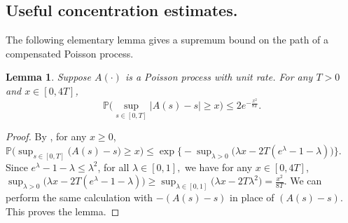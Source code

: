 \documentclass[11pt, reqno]{article}
\newtheorem{lemma}[theorem]{Lemma}
\numberwithin{equation}{section}
\numberwithin{theorem}{section}
\begin{document}
\begin{appendix}


\section{Useful concentration estimates.}\label{app:conc}

The following elementary lemma gives a supremum bound on the path of a compensated Poisson process.
\begin{lemma}\label{lem:sup-poi}
Suppose $A(\cdot)$ is a Poisson process with unit rate. For any $T>0$ and $ x\in [0, 4T]$,
$$\mathbb{P}\big(\sup_{s\in[0,T]}\left|A(s)-s\right|\geq x\big)\leq 2 e^{-\frac{x^2}{8T}}.$$
\end{lemma}
\begin{proof}
By \cite[Theorem 5, Chapter 4, Page 351]{LS}, for any $x \ge 0$,
$\mathbb{P}\big(\sup_{s\in[0,T]}\big(A(s)-s\big)\geq x\big)\leq \exp\big\{-\sup_{\lambda>0}\big(\lambda x-2T(e^{\lambda}-1-\lambda)\big)\big\}.$
Since $e^{\lambda}-1-\lambda\leq \lambda^2$, for all $\lambda\in [0,1],$
we have for any $x \in [0,4T]$, $\sup_{\lambda>0}\big(\lambda x- 2T(e^{\lambda}-1-\lambda)\big)\geq \sup_{\lambda\in[0,1]}\big(\lambda x-2T\lambda^2\big)=\frac{x^2}{8T}.$
We can perform the same calculation with $-(A(s)-s)$ in place of $(A(s)-s)$. This proves the lemma. 
\end{proof}


\end{appendix}
\end{document}
